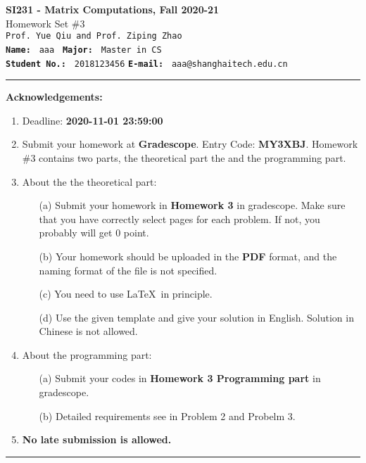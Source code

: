 \documentclass[english,onecolumn]{IEEEtran}
\begin{document}
\begin{center}
	\textbf{\LARGE{SI231 - Matrix Computations, Fall 2020-21}}\\
	{\Large Homework Set \#3}\\
	\texttt{Prof. Yue Qiu and Prof. Ziping Zhao}\\
	\texttt{\textbf{Name:}}   	\texttt{ aaa }  		\hspace{1bp}
	\texttt{\textbf{Major:}}  	\texttt{ Master in CS } 	\\
	\texttt{\textbf{Student No.:}} 	\texttt{ 2018123456}     \hspace{1bp}
	\texttt{\textbf{E-mail:}} 	\texttt{ aaa@shanghaitech.edu.cn}
\par\end{center}



\noindent
\rule{\linewidth}{0.4pt}
{\bf {\large Acknowledgements:}}
\begin{enumerate}
    \item Deadline: \textbf{2020-11-01 23:59:00}
    \item Submit your homework at \textbf{Gradescope}. Entry Code: \textbf{MY3XBJ}. 
    Homework \#3 contains two parts, the theoretical part the and the programming part.
    \item About the the theoretical part:
    \begin{enumerate}
            \item[(a)] Submit your homework in \textbf{Homework 3} in gradescope. Make sure that you have correctly select pages for each problem. If not, you probably will get 0 point.
            \item[(b)] Your homework should be uploaded in the \textbf{PDF} format, and the naming format of the file is not specified.
            \item[(c)] You need to use \LaTeX $\,$ in principle.
            \item[(d)] Use the given template and give your solution in English. Solution in Chinese is not allowed. 
        \end{enumerate}
  \item About the programming part:
  \begin{enumerate}
      \item[(a)] Submit your codes in \textbf{Homework 3 Programming part} in gradescope.
      \item[(b)] Detailed requirements see in Problem 2 and Probelm 3.
  \end{enumerate}
  \item \textbf{No late submission is allowed.}
\end{enumerate}
\rule{\linewidth}{0.4pt}
\newpage 
\end{document}
